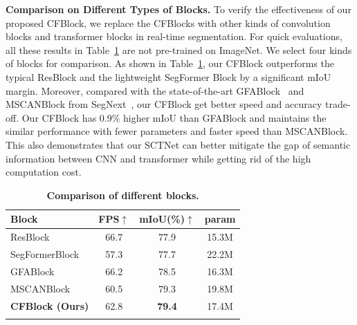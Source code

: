 \documentclass[letterpaper]{article} %
\begin{document}
\noindent
{\bf Comparison on Different Types of Blocks.} To verify the effectiveness of our proposed CFBlock, we replace the CFBlocks with other kinds of convolution blocks and transformer blocks in real-time segmentation. For quick evaluations, all these results in Table~\ref{tab:Block Ablation} are not pre-trained on ImageNet. We select four kinds of blocks for comparison. As shown in Table~\ref{tab:Block Ablation}, our CFBlock outperforms the typical ResBlock and the lightweight SegFormer Block by a significant mIoU margin. Moreover, compared with the state-of-the-art GFABlock~\cite{wang2022rtformer} and MSCANBlock from SegNext~\cite{guo2022segnext}, our CFBlock get better speed and accuracy trade-off. Our CFBlock has 0.9\% higher mIoU than GFABlock and maintains the similar performance with fewer parameters and faster speed than MSCANBlock. This also demonstrates that our SCTNet can better mitigate the gap of semantic information between CNN and transformer while getting rid of the high computation cost.
\begin{table}
	\begin{center}
        \setlength{\tabcolsep}{1mm}
        \centering
        \begin{tabular}{l|c|c|c}
        \Xhline{1pt}
            Block
            &FPS$\uparrow$
            &mIoU(\%)$\uparrow$
            &param\\
            \hline
            ResBlock &66.7 &77.9 &15.3M\\
            SegFormerBlock &57.3 &77.7 &22.2M\\
            GFABlock &66.2 &78.5 &16.3M\\
            MSCANBlock &60.5    &79.3 &19.8M    \\
            \textbf{CFBlock (Ours)} &62.8 &\textbf{79.4} &17.4M\\
        \Xhline{1pt}
        \end{tabular}
      \end{center}
      \caption{\textbf{Comparison of different blocks.}}
         \label{tab:Block Ablation}
\vspace{-10pt}
\end{table}
\end{document}
